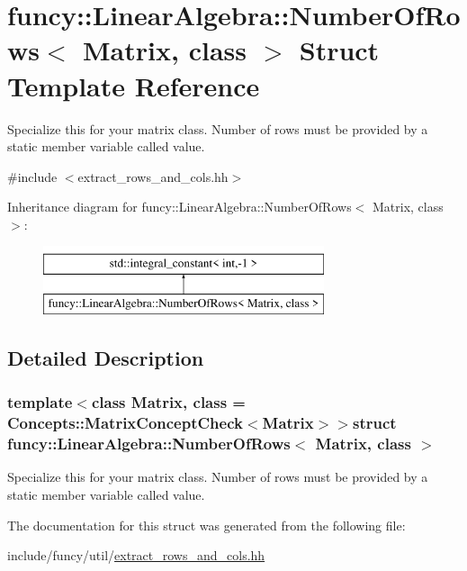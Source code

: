 \hypertarget{structfuncy_1_1LinearAlgebra_1_1NumberOfRows}{\section{funcy\-:\-:Linear\-Algebra\-:\-:Number\-Of\-Rows$<$ Matrix, class $>$ Struct Template Reference}
\label{structfuncy_1_1LinearAlgebra_1_1NumberOfRows}
}


Specialize this for your matrix class. Number of rows must be provided by a static member variable called value.  




{\ttfamily \#include $<$extract\-\_\-rows\-\_\-and\-\_\-cols.\-hh$>$}

Inheritance diagram for funcy\-:\-:Linear\-Algebra\-:\-:Number\-Of\-Rows$<$ Matrix, class $>$\-:\begin{figure}[H]
\begin{center}
\leavevmode
\includegraphics[height=2.000000cm]{structfuncy_1_1LinearAlgebra_1_1NumberOfRows}
\end{center}
\end{figure}


\subsection{Detailed Description}
\subsubsection*{template$<$class Matrix, class = Concepts\-::\-Matrix\-Concept\-Check$<$\-Matrix$>$$>$struct funcy\-::\-Linear\-Algebra\-::\-Number\-Of\-Rows$<$ Matrix, class $>$}

Specialize this for your matrix class. Number of rows must be provided by a static member variable called value. 

The documentation for this struct was generated from the following file\-:\begin{DoxyCompactItemize}
\item 
include/funcy/util/\hyperlink{extract__rows__and__cols_8hh}{extract\-\_\-rows\-\_\-and\-\_\-cols.\-hh}\end{DoxyCompactItemize}
